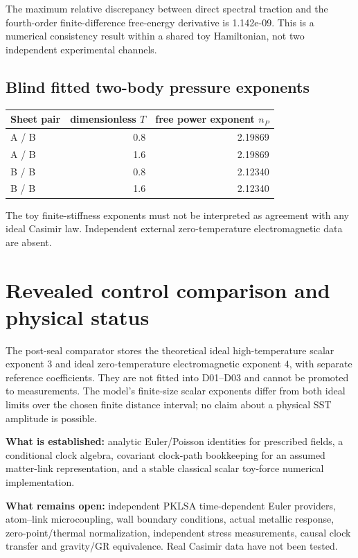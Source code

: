 \documentclass[10pt,a4paper]{article}
\begin{document}
The maximum relative discrepancy between direct spectral traction and the fourth-order finite-difference free-energy derivative is 1.142e-09. This is a numerical consistency result within a shared toy Hamiltonian, not two independent experimental channels.

\subsection{Blind fitted two-body pressure exponents}
\begin{center}\begin{tabular}{@{}lrr@{}}\toprule
Sheet pair & dimensionless $T$ & free power exponent $n_P$\\\midrule
A / B & 0.8 & 2.19869 \\
A / B & 1.6 & 2.19869 \\
B / B & 0.8 & 2.12340 \\
B / B & 1.6 & 2.12340 \\
\bottomrule\end{tabular}\end{center}
The toy finite-stiffness exponents must not be interpreted as agreement with any ideal Casimir law. Independent external zero-temperature electromagnetic data are absent.

\section{Revealed control comparison and physical status}
The post-seal comparator stores the theoretical ideal high-temperature scalar exponent $3$ and ideal zero-temperature electromagnetic exponent $4$, with separate reference coefficients. They are not fitted into D01--D03 and cannot be promoted to measurements. The model's finite-size scalar exponents differ from both ideal limits over the chosen finite distance interval; no claim about a physical SST amplitude is possible.

\textbf{What is established:} analytic Euler/Poisson identities for prescribed fields, a conditional clock algebra, covariant clock-path bookkeeping for an assumed matter-link representation, and a stable classical scalar toy-force numerical implementation.

\textbf{What remains open:} independent PKLSA time-dependent Euler providers, atom--link microcoupling, wall boundary conditions, actual metallic response, zero-point/thermal normalization, independent stress measurements, causal clock transfer and gravity/GR equivalence. Real Casimir data have not been tested.
\end{document}
